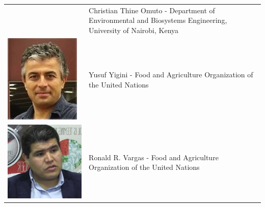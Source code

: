 \documentclass[10pt,b5paper,]{book}
\theoremstyle{definition}
\theoremstyle{definition}
\theoremstyle{definition}
\theoremstyle{remark}
\begin{document}
\begin{longtable}[]{@{}ll@{}}
\begin{minipage}[t]{0.11\columnwidth}
\end{minipage} & \begin{minipage}[t]{0.83\columnwidth}\raggedright
Christian Thine Omuto - Department of Environmental and Biosystems
Engineering, University of Nairobi, Kenya\strut
\end{minipage}\tabularnewline
\begin{minipage}[t]{0.11\columnwidth}\raggedright
\includegraphics{contrAuthors/Yigini.jpg}\strut
\end{minipage} & \begin{minipage}[t]{0.83\columnwidth}\raggedright
Yusuf Yigini - Food and Agriculture Organization of the United
Nations\strut
\end{minipage}\tabularnewline
\begin{minipage}[t]{0.11\columnwidth}\raggedright
\includegraphics{contrAuthors/Vargas.jpg}\strut
\end{minipage} & \begin{minipage}[t]{0.83\columnwidth}\raggedright
Ronald R. Vargas - Food and Agriculture Organization of the United
Nations\strut
\end{minipage}\tabularnewline
\bottomrule
\end{longtable}
\end{document}
